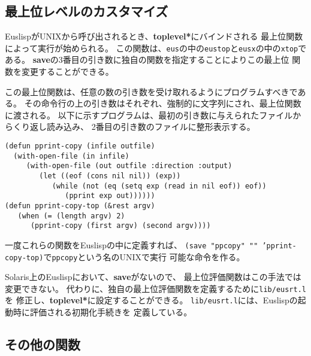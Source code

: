 \subsection{最上位レベルのカスタマイズ}
EuslispがUNIXから呼び出されるとき、{\bf *toplevel*}にバインドされる
最上位関数によって実行が始められる。
この関数は、{\tt eus}の中の{\tt eustop}と{\tt eusx}の中の{\tt xtop}である。
{\bf save}の3番目の引き数に独自の関数を指定することによりこの最上位
関数を変更することができる。

この最上位関数は、任意の数の引き数を受け取れるようにプログラムすべきである。
その命令行の上の引き数はそれぞれ、強制的に文字列にされ、最上位関数に渡される。
以下に示すプログラムは、最初の引き数に与えられたファイルからくり返し読み込み、
2番目の引き数のファイルに整形表示する。

\begin{verbatim}
(defun pprint-copy (infile outfile)
  (with-open-file (in infile)
     (with-open-file (out outfile :direction :output)
        (let ((eof (cons nil nil)) (exp))
           (while (not (eq (setq exp (read in nil eof)) eof))
              (pprint exp out))))))
(defun pprint-copy-top (&rest argv)
   (when (= (length argv) 2)
      (pprint-copy (first argv) (second argv))))
\end{verbatim}

一度これらの関数をEuslispの中に定義すれば、
{\tt (save "ppcopy" "" 'pprint-copy-top)}で{\tt ppcopy}という名のUNIXで実行
可能な命令を作る。

Solaris上のEuslispにおいて、{\bf save}がないので、
最上位評価関数はこの手法では変更できない。
代わりに、独自の最上位評価関数を定義するために{\tt lib/eusrt.l}を
修正し、{\bf *toplevel*}に設定することができる。
{\tt lib/eusrt.l}には、Euslispの起動時に評価される初期化手続きを
定義している。

\subsection{その他の関数}

\begin{refdesc}



\end{refdesc}

\newpage
